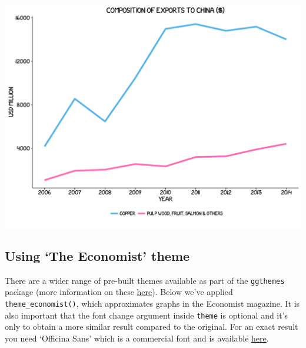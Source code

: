 \documentclass[]{article}
\begin{document}
\begin{center}\includegraphics{0_all_posts_pdf/line_8-1} \end{center}

\subsection{\texorpdfstring{Using `The Economist'
theme}{Using The Economist theme}}\label{using-the-economist-theme}

There are a wider range of pre-built themes available as part of the
\texttt{ggthemes} package (more information on these
\href{https://cran.r-project.org/web/packages/ggthemes/vignettes/ggthemes.html}{here}).
Below we've applied \texttt{theme\_economist()}, which approximates
graphs in the Economist magazine. It is also important that the font
change argument inside \texttt{theme} is optional and it's only to
obtain a more similar result compared to the original. For an exact
result you need `Officina Sans' which is a commercial font and is
available \href{http://www.myfonts.com/fonts/itc/officina-sans/}{here}.
\end{document}
